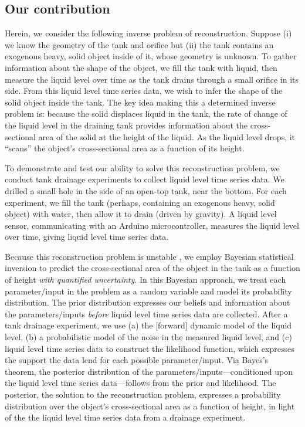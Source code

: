 \documentclass[openacc]{rsproca_new}%
\begin{document}
\subsection{Our contribution}
Herein, we consider the following inverse problem of reconstruction.
Suppose (i) we know the geometry of the tank and orifice but (ii) the tank contains an exogenous heavy, solid object inside of it, whose geometry is unknown.
To gather information about the shape of the object, we fill the tank with liquid, then measure the liquid level over time as the tank drains through a small orifice in its side. 
From this liquid level time series data, we wish
to infer the shape of the solid object inside the tank. 
The key idea making this a determined inverse problem is:
because the solid displaces liquid in the tank, the rate of change of the liquid level in the draining tank provides information about the cross-sectional area of the solid at the height of the liquid.
As the liquid level drops, it ``scans'' the object's cross-sectional area as a function of its height.

To demonstrate and test our ability to solve this reconstruction problem, we conduct tank drainage experiments to collect liquid level time series data.
We drilled a small hole in the side of an open-top tank, near the bottom.
For each experiment, we fill the tank (perhaps, containing an exogenous heavy, solid object) with water, then allow it to drain (driven by gravity). A liquid level sensor, communicating with an Arduino microcontroller, measures the liquid level over time, giving liquid level time series data. 

Because this reconstruction problem is unstable \cite{groetsch1993inverse}, we employ Bayesian statistical inversion \cite{calvetti2018inverse,waqar2023tutorial,kaipio2006statistical,dashti2013bayesian} to predict the cross-sectional area of the object in the tank as a function of height \emph{with quantified uncertainty}.
In this Bayesian approach, we treat each parameter/input in the problem as a random variable and model its probability distribution.
The prior distribution expresses our beliefs and information about the parameters/inputs \emph{before} liquid level time series data are collected.
After a tank drainage experiment, we use (a) the [forward] dynamic model of the liquid level, (b) a probabilistic model of the noise in the measured liquid level, and (c) liquid level time series data to construct the likelihood function, which expresses the support the data lend for each possible parameter/input.
Via Bayes's theorem, the posterior distribution of the parameters/inputs---conditioned upon the liquid level time series data---follows from the prior and likelihood. The posterior, the solution to the reconstruction problem, expresses a probability distribution over the object's cross-sectional area as a function of height, in light of the the liquid level time series data from a drainage experiment.
\end{document}
